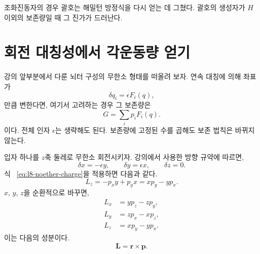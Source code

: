 \begin{classroomqa} \end{classroomqa}

조화진동자의 경우 괄호는 해밀턴 방정식을 다시 얻는 데 그쳤다. 괄호의 생성자가 \(H\) 이외의 보존량일 때 그 진가가 드러난다.

\section{회전 대칭성에서 각운동량 얻기}

강의 앞부분에서 다룬 뇌터 구성의 무한소 형태를 떠올려 보자. 연속 대칭에 의해 좌표가 \begin{equation}
  \delta q_i=\epsilon F_i(q),
  \label{eq:l8-noether-variation}
\end{equation}만큼 변한다면, 여기서 고려하는 경우 그 보존량은 \begin{equation}
  G=\sum_i p_iF_i(q).
  \label{eq:l8-noether-charge}
\end{equation}이다. 전체 인자 \(\epsilon\)는 생략해도 된다. 보존량에 고정된 수를 곱해도 보존 법칙은 바뀌지 않는다.

입자 하나를 \(z\)축 둘레로 무한소 회전시키자. 강의에서 사용한 방향 규약에 따르면, \begin{equation}
  \delta x=-\epsilon y,\qquad
  \delta y=\epsilon x,\qquad
  \delta z=0.
  \label{eq:l8-z-rotation}
\end{equation} 식 ~\eqref{eq:l8-noether-charge}을 적용하면 다음과 같다. \begin{equation}
  L_z=-p_xy+p_yx=xp_y-yp_x.
  \label{eq:l8-lz}
\end{equation} \(x\), \(y\), \(z\)을 순환적으로 바꾸면, \begin{equation}
  \boxed{\begin{aligned}
    L_x&=yp_z-zp_y,\\
    L_y&=zp_x-xp_z,\\
    L_z&=xp_y-yp_x.
  \end{aligned}}
  \label{eq:l8-angular-components}
\end{equation} 이는 다음의 성분이다. \begin{equation}
  \boldsymbol L=\boldsymbol r\times\boldsymbol p.
  \label{eq:l8-cross-product}
\end{equation}

